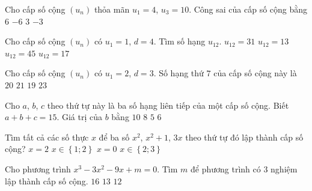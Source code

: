 \begin{ex}%
	Cho cấp số cộng $\left(u_n \right)$ thỏa mãn $u_1=4$, $u_3=10$. Công sai của cấp số cộng bằng
	\choice
	{$6$}
	{$-6$}
	{\True $3$}
	{$-3$}
\end{ex}
\begin{ex}%
	Cho cấp số cộng $\left(u_n \right)$ có $u_1=1$, $d=4$. Tìm số hạng $u_{12}$.
	\choice
	{$u_{12}=31$}
	{$u_{12}=13$}
	{\True $u_{12}=45$}
	{$u_{12}=17$}
\end{ex}
\begin{ex}%
	Cho cấp số cộng $\left(u_n \right)$ có $u_1=2$, $d=3$. Số hạng thứ $7$ của cấp số cộng này là
	\choice
	{\True $20$}
	{$21$}
	{$19$}
	{$23$}
\end{ex}
\begin{ex}%
	 Cho $a$, $b$, $c$ theo thứ tự này là ba số hạng liên tiếp của một cấp số cộng. Biết $a+b+c=15$. Giá trị của $b$ bằng
	\choice
	{$10$}
	{$8$}
	{\True $5$}
	{$6$}
\end{ex}
\begin{ex}%
	Tìm tất cả các số thực $x$ để ba số $x^2$, $x^2+1$, $3x$ theo thứ tự đó lập thành cấp số cộng?
	\choice
	{$x=2$}
	{\True $x\in \left\{1;2\right\}$}
	{$x=0$}
	{$x\in \left\{2;3\right\}$}
\end{ex}
\begin{ex}%
	Cho phương trình $x^3-3x^2-9x+m=0$. Tìm $m$ để phương trình có $3$ nghiệm lập thành cấp số cộng.
	\choice
	{$16$}
	{$13$}
	{$12$}
	{}
\end{ex}
